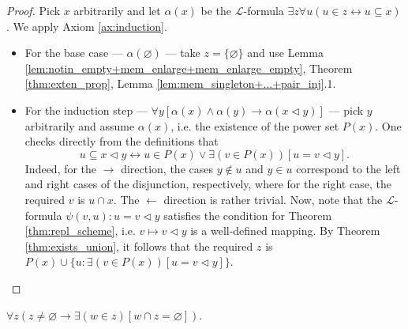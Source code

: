 \begin{proof}
    \leanok
    Pick $x$ arbitrarily and let $\alpha (x)$ be the $\mathcal{L}$-formula 
    $\exists z \forall u (u\in z \leftrightarrow u \subseteq x)$.
    We apply Axiom \ref{ax:induction}.
    \begin{itemize}
        \item For the base case — $\alpha (\varnothing)$ — take $z=\{\varnothing\}$ and use 
        Lemma \ref{lem:notin_empty+mem_enlarge+mem_enlarge_empty}, 
        Theorem \ref{thm:exten_prop}, Lemma \ref{lem:mem_singleton+...+pair_inj}.1.
        \item For the induction step 
        — $\forall y[\alpha(x) \land \alpha(y) \rightarrow \alpha(x \lhd y)]$ — 
        pick $y$ arbitrarily and assume $\alpha(x)$, i.e. the existence of the power set $P(x)$.
        One checks directly from the definitions that 
        $$u \subseteq x \lhd y \leftrightarrow u \in P(x) \lor \exists (v \in P(x))[u=v\lhd y].$$
        Indeed, for the $\rightarrow$ direction, the cases $y \notin u$ and $y \in u$ correspond to 
        the left and right cases of the disjunction, respectively, where for the right case, 
        the required $v$ is $u \cap x$. The $\leftarrow$ direction is rather trivial.
        Now, note that the $\mathcal{L}$-formula $\psi(v,u): u = v \lhd y$ satisfies the condition 
        for Theorem \ref{thm:repl_scheme}, i.e. $v \mapsto v \lhd y$ is a well-defined mapping.
        By Theorem \ref{thm:exists_union}, 
        it follows that the required $z$ is $P(x) \cup \{u : \exists (v \in P(x)) [u=v\lhd y]\}$.
    \end{itemize}
\end{proof}

\begin{theorem}
    \label{thm:found_prop}
    \leanok
    $\forall z (z\neq \varnothing \rightarrow \exists (w \in z)[w\cap z = \varnothing])$.
\end{theorem}

